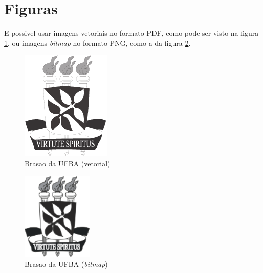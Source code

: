 \section{Figuras} \label{sec:figuras}

E possivel usar imagens vetoriais no \cite{andrade2006} formato PDF, como pode ser visto
na figura \ref{fig:ufba}, ou imagens \emph{bitmap} no formato PNG, como
a da figura \ref{fig:ufba2}.

\begin{figure}
\centering
\includegraphics{brasaoUFBA2}
\caption{Brasao da UFBA (vetorial)}
\label{fig:ufba}
\end{figure}

\begin{figure}
\centering
\includegraphics[width=0.3\textwidth]{brasaoUFBA}
\caption{Brasao da UFBA (\emph{bitmap})}
\label{fig:ufba2}
\end{figure}

